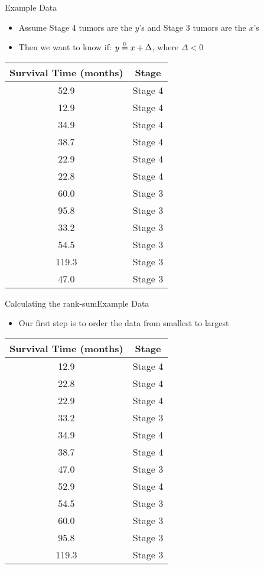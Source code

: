 \documentclass[xcolor=dvipsnames]{beamer}
\newcommand\myeq{\mathrel{\overset{\makebox[0pt]{\mbox{\normalfont\tiny\sffamily D}}}{=}}}
\begin{document}
\begin{frame}{Example Data}
\begin{itemize}
	\item Assume Stage 4 tumors are the $y$'s and Stage 3 tumors are the $x$'s
	\item Then we want to know if: $y \myeq x + \Delta$, where $\Delta < 0$
\end{itemize}
\begin{center}
	\begin{tabular}{|c|c|}
		\hline
		\textbf{Survival Time (months)} &  \textbf{Stage} \\ \hline \hline
		52.9  &Stage 4 \\ \hline
		12.9 &Stage 4 \\ \hline
		34.9& Stage 4 \\ \hline
		38.7 &Stage 4 \\ \hline
		22.9& Stage 4 \\ \hline
		22.8 &Stage 4 \\ \hline
		60.0 &Stage 3 \\ \hline
		95.8& Stage 3 \\ \hline
		33.2 &Stage 3 \\ \hline
		54.5 &Stage 3 \\ \hline
		119.3 &Stage 3 \\ \hline
		47.0 &Stage 3 \\ \hline
	\end{tabular}
\end{center}
\end{frame}

\begin{frame}{Calculating the rank-sum}{Example Data}
\begin{itemize}
	\item Our first step is to order the data from smallest to largest
\end{itemize}
\begin{center}
	\begin{tabular}{|c|c|}
		\hline
		\textbf{Survival Time (months)} &  \textbf{Stage} \\ \hline \hline
		12.9 &Stage 4 \\ \hline
		22.8 &Stage 4 \\ \hline
		22.9& Stage 4 \\ \hline
		33.2 &Stage 3 \\ \hline
		34.9& Stage 4 \\ \hline
		38.7 &Stage 4 \\ \hline
		47.0 &Stage 3 \\ \hline		
		52.9  &Stage 4 \\ \hline
		54.5 &Stage 3 \\ \hline				
		60.0 &Stage 3 \\ \hline
		95.8& Stage 3 \\ \hline
		119.3 &Stage 3 \\ \hline
	\end{tabular}
\end{center}
\end{frame}
\end{document}
